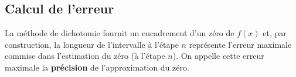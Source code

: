 %


%
%
%
%



\subsection{Calcul de l'erreur}

La méthode de dichotomie fournit un encadrement d'un zéro de $f(x)$ et, par construction, la longueur de l'intervalle à l'étape $n$ représente l'erreur maximale commise dans l'estimation du zéro (à l'étape $n$). On appelle cette erreur maximale  la \textbf{précision} de l'approximation du zéro.

